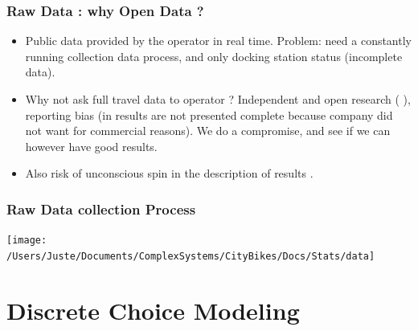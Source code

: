 \documentclass[english,10pt]{beamer}
\begin{document}

\begin{frame}
\frametitle{Raw Data : why Open Data ?}

\begin{itemize}
\item Public data provided by the operator in real time. Problem: need a
constantly running collection data process, and only docking station
status (incomplete data).
\vfill{}
\item Why not ask full travel data to operator ? Independent and open research
(\cite{banos2013HDR} ), reporting bias (in \cite{nair2013large}
results are not presented complete because company did not want for
commercial reasons). We do a compromise, and see if we can however
have good results.
\vfill{}
\item Also risk of unconscious spin in the description of results \cite{boutron2010reporting}.
\end{itemize}
\vfill{}
\end{frame}


\begin{frame}
\frametitle{Raw Data collection Process}
\hfill{}\texttt{[image: /Users/Juste/Documents/ComplexSystems/CityBikes/Docs/Stats/data]}\hfill{}
\end{frame}


\section{Discrete Choice Modeling}

\end{document}
